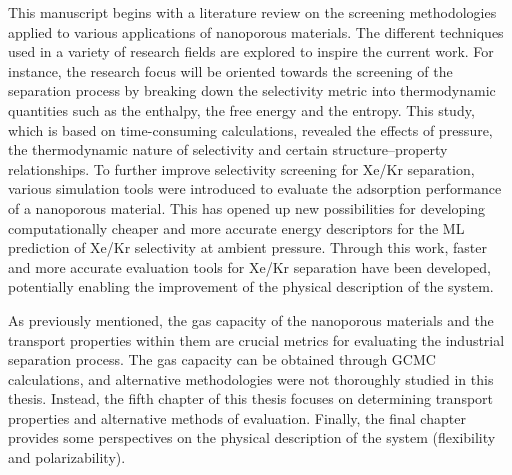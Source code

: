 \begin{center}
\end{center}

This manuscript begins with a literature review on the screening methodologies applied to various applications of nanoporous materials. The different techniques used in a variety of research fields are explored to inspire the current work.\autocite{Ren_2022} For instance, the research focus will be oriented towards the screening of the separation process by breaking down the selectivity metric into thermodynamic quantities such as the enthalpy, the free energy and the entropy. This study, which is based on time-consuming calculations, revealed the effects of pressure, the thermodynamic nature of selectivity and certain structure--property relationships.\autocite{Ren_2021} To further improve selectivity screening for Xe/Kr separation, various simulation tools were introduced to evaluate the adsorption performance of a nanoporous material.\autocite{Ren_2023} This has opened up new possibilities for developing computationally cheaper and more accurate energy descriptors for the ML prediction of Xe/Kr selectivity at ambient pressure.\autocite{Ren_2023_ml} Through this work, faster and more accurate evaluation tools for Xe/Kr separation have been developed, potentially enabling the improvement of the physical description of the system. 

As previously mentioned, the gas capacity of the nanoporous materials and the transport properties within them are crucial metrics for evaluating the industrial separation process. The gas capacity can be obtained through GCMC calculations, and alternative methodologies were not thoroughly studied in this thesis. Instead, the fifth chapter of this thesis focuses on determining transport properties and alternative methods of evaluation. Finally, the final chapter provides some perspectives on the physical description of the system (flexibility and polarizability).


\vfill
\begin{center}
\end{center}
\vfill\vfill